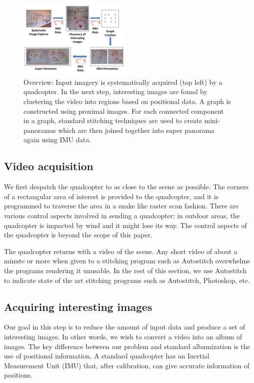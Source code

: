 \documentclass[10pt,twocolumn,letterpaper]{article}
\begin{document}
\begin{figure}[h!]
  \centering
  \includegraphics[width=0.49\textwidth]{figures/Workflow} 
  \caption{ \label{fig:workflow} Overview: Input imagery is
    systematically acquired (top left) by a quadcopter.  In the next
    step, interesting images are found by clustering the video into
    regions based on positional data.  A graph is constructed using
    proximal images. For each connected component in a graph, standard
    stitching techniques are used to create mini-panoramas which are
    then joined together into super panorama 
    again using IMU data.}
\end{figure}    


\subsection{Video acquisition}
We first despatch the quadcopter to as close to the scene as
possible. The corners of a rectangular area of interest is provided to
the quadcopter, and it is programmed to traverse the area in a snake
like raster scan fashion.  There are various control aspects involved
in sending a quadcopter; in outdoor areas, the quadcopter is impacted
by wind and it might lose its way.  The control aspects of the
quadcopter is beyond the scope of this paper.

The quadcopter returns with a video of the scene.  Any short video of
about a minute or more when given to a stitching program such as
Autostitch overwhelms the programs rendering it unusable. In the rest
of this section, we use Autostitch to indicate state of the art
stitching programs such as Autostitch, Photoshop, etc.

\subsection{Acquiring interesting images}
\label{sec:selection}
Our goal in this step is to reduce the amount of input data and
produce a set of interesting images.  In other words, we wish to
convert a video into an album of images.  The key difference between
our problem and standard albumization \cite{Aner, Lee} is the use of 
positional information.  A standard quadcopter has an Inertial
Measurement Unit (IMU) that, after calibration, can give accurate
information of positions.
\end{document}
